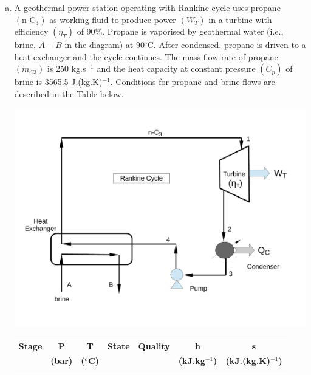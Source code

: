 \documentclass[calculator,steamtables,refrigeranttables,psychrometricchart,datasheet,solutions]{exam}
\begin{document}
\begin{question}
%
\begin{enumerate}[(a)]
\item  A geothermal power station operating with Rankine cycle uses propane $\left(\text{n-C}_{3}\right)$ as working fluid to produce power $\left(W_{T}\right)$ in a turbine with efficiency $\left(\eta_{T}\right)$ of 90$\%$. Propane is vaporised by geothermal water (i.e., brine, $A-B$ in the diagram) at 90$^{\circ}$C. After condensed, propane is driven to a heat exchanger and the cycle continues. The mass flow rate of propane $\left(\dot{m}_{C3}\right)$ is 250 kg.s$^{-1}$ and the heat capacity at constant pressure $\left(C_{p}\right)$ of brine is 3565.5 J.(kg.K)$^{-1}$. Conditions for propane and brine flows are described in the Table below.
\begin{center}
\includegraphics[width=12.cm,height=10.cm,clip]{./Pics/RankineCycle}
\end{center} 
\begin{table}[h]\label{Q2_Table}
\begin{center}
\begin{tabular} {||c | c c c c c c || }
\hline\hline
{\bf Stage} & {\bf P}    & {\bf T}        & {\bf State}    &  {\bf Quality }     &  {\bf h}             & {\bf s}                  \\
            & {\bf (bar)}& {\bf ($^{o}$C)} &               &                     & {\bf (kJ.kg$^{-1}$)}  & {\bf (kJ.(kg.K)$^{-1}$)}  \\

\end{tabular}
\end{center}
\end{table}
\end{enumerate}
\end{question}
\end{document}
